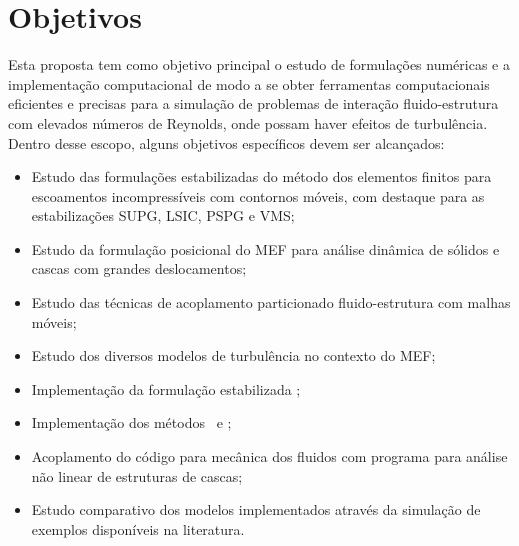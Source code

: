 
\section{Objetivos}

Esta proposta tem como objetivo principal o estudo de formulações numéricas e a implementação computacional de modo a se obter ferramentas computacionais eficientes e precisas para a simulação de problemas de interação fluido-estrutura com elevados números de Reynolds, onde possam haver efeitos de turbulência. Dentro desse escopo, alguns objetivos específicos devem ser alcançados:

\begin{itemize}
    \item Estudo das formulações estabilizadas do método dos elementos finitos para escoamentos incompressíveis com contornos móveis, com destaque para as estabilizações SUPG, LSIC, PSPG e VMS;

    \item Estudo da formulação posicional do MEF para análise dinâmica de sólidos e cascas com grandes deslocamentos;

    \item Estudo das técnicas de acoplamento particionado fluido-estrutura com malhas móveis;

    \item Estudo dos diversos modelos de turbulência no contexto do MEF;

    \item Implementação da formulação estabilizada \VMS;

    \item Implementação dos métodos \RANS\ e \LES;

    \item Acoplamento do código para mecânica dos fluidos com programa para análise não linear de estruturas de cascas;

    \item Estudo comparativo dos modelos implementados através da simulação de exemplos disponíveis na literatura.
\end{itemize}

